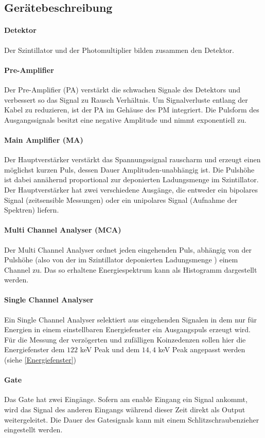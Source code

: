 \documentclass[12pt,listof=totoc]{scrartcl}
\begin{document}
 \subsection{Gerätebeschreibung}
 \paragraph{Detektor} Der Szintillator und der Photomultiplier bilden zusammen den Detektor.
 \paragraph{Pre-Amplifier}
 Der Pre-Amplifier (PA) verstärkt die schwachen Signale des Detektors und verbessert so
 das Signal zu Rausch Verhältnis. Um Signalverluste entlang der Kabel zu reduzieren, ist der PA im Gehäuse des PM integriert. Die Pulsform des Ausgangssignals besitzt eine negative Amplitude und nimmt exponentiell zu.
 \paragraph{Main Amplifier (MA)}
 Der Hauptverstärker  verstärkt das Spannungssignal rauscharm und erzeugt einen möglichst kurzen Puls, dessen Dauer Amplituden-unabhängig ist. Die Pulshöhe ist dabei annähernd proportional zur deponierten Ladungsmenge im Szintillator. Der Hauptverstärker hat zwei verschiedene Ausgänge, die entweder ein bipolares Signal (zeitsensible Messungen) oder ein unipolares Signal (Aufnahme der Spektren) liefern.
 \paragraph{Multi Channel Analyser (MCA)}
 Der Multi Channel Analyser ordnet jeden eingehenden Puls, abhängig von der Pulshöhe (also von der im Szintillator deponierten Ladungsmenge ) einem Channel zu. Das so erhaltene Energiespektrum kann als Histogramm dargestellt werden.
 \paragraph{Single Channel Analyser}
 Ein Single Channel Analyser selektiert aus eingehenden Signalen in dem nur für Energien in einem einstellbaren Energiefenster ein Ausgangspuls erzeugt wird.  Für die Messung der verzögerten und zufälligen Koinzedenzen sollen hier die Energiefenster dem $122$ keV Peak und dem $14,4$ keV Peak angepasst werden (siehe \ref{Energiefenster})
 \paragraph{Gate} Das Gate hat zwei Eingänge. Sofern am enable Eingang ein Signal ankommt, wird das Signal des anderen Eingangs während dieser Zeit direkt als Output weitergeleitet. Die Dauer des Gatesignals kann mit einem Schlitzschraubenzieher eingestellt werden.
\end{document}
